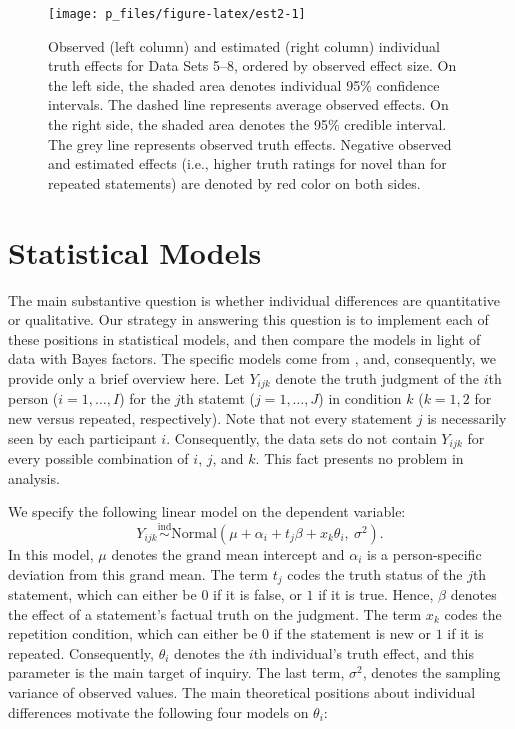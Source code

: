 \documentclass[
  english,
  ,man,floatsintext]{apa6}
\begin{document}
\begin{figure}
\texttt{[image: p\_files/figure-latex/est2-1]} \caption{Observed (left column) and estimated (right column) individual truth effects for Data Sets 5--8, ordered by observed effect size. On the left side, the shaded area denotes individual 95\% confidence intervals. The dashed line represents average observed effects. On the right side, the shaded area denotes the 95\% credible interval. The grey line represents observed truth effects. Negative observed and estimated effects (i.e., higher truth ratings for novel than for repeated statements) are denoted by red color on both sides.}\label{fig:est2}
\end{figure}

\hypertarget{statistical-models}{%
\section{Statistical Models}\label{statistical-models}}

The main substantive question is whether individual differences are quantitative or qualitative. Our strategy in answering this question is to implement each of these positions in statistical models, and then compare the models in light of data with Bayes factors. The specific models come from \textcite{haaf2017}, and, consequently, we provide only a brief overview here. Let \(Y_{ijk}\) denote the truth judgment of the \(i\)th person (\(i = 1, \ldots ,I\)) for the \(j\)th statemt (\(j = 1,\ldots, J\)) in condition \(k\) (\(k = 1,2\) for new versus repeated, respectively). Note that not every statement \(j\) is necessarily seen by each participant \(i\). Consequently, the data sets do not contain \(Y_{ijk}\) for every possible combination of \(i\), \(j\), and \(k\). This fact presents no problem in analysis.

We specify the following linear model on the dependent variable:
\begin{equation}
  Y_{ijk} \overset{\text{ind}}{\sim} \text{Normal} (\mu + \alpha_i + t_j \beta + x_k \theta_i,\ \sigma^2).
\end{equation}
In this model, \(\mu\) denotes the grand mean intercept and \(\alpha_i\) is a person-specific deviation from this grand mean. The term \(t_j\) codes the truth status of the \(j\)th statement, which can either be \(0\) if it is false, or \(1\) if it is true. Hence, \(\beta\) denotes the effect of a statement's factual truth on the judgment. The term \(x_k\) codes the repetition condition, which can either be \(0\) if the statement is new or \(1\) if it is repeated. Consequently, \(\theta_i\) denotes the \(i\)th individual's truth effect, and this parameter is the main target of inquiry. The last term, \(\sigma^2\), denotes the sampling variance of observed values. The main theoretical positions about individual differences motivate the following four models on \(\theta_i\):
\end{document}
